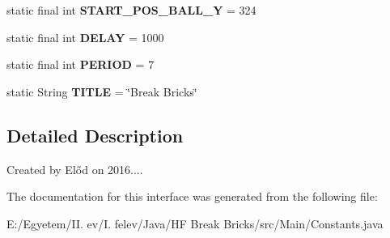 \begin{DoxyCompactItemize}
\item 
static final int {\bfseries S\+T\+A\+R\+T\+\_\+\+P\+O\+S\+\_\+\+B\+A\+L\+L\+\_\+Y} = 324\hypertarget{interface_main_1_1_constants_ad0e276f2bb956f718629e1f6fa1988e7}{}\label{interface_main_1_1_constants_ad0e276f2bb956f718629e1f6fa1988e7}

\item 
static final int {\bfseries D\+E\+L\+AY} = 1000\hypertarget{interface_main_1_1_constants_a01bea59ae678a38ee578ebc11212f236}{}\label{interface_main_1_1_constants_a01bea59ae678a38ee578ebc11212f236}

\item 
static final int {\bfseries P\+E\+R\+I\+OD} = 7\hypertarget{interface_main_1_1_constants_abb67371ab97c59dda27d443b0b00ba8f}{}\label{interface_main_1_1_constants_abb67371ab97c59dda27d443b0b00ba8f}

\item 
static String {\bfseries T\+I\+T\+LE} = \char`\"{}Break Bricks\char`\"{}\hypertarget{interface_main_1_1_constants_a91b7cff93f92379d2649db9297cf5503}{}\label{interface_main_1_1_constants_a91b7cff93f92379d2649db9297cf5503}

\end{DoxyCompactItemize}


\subsection{Detailed Description}
Created by Előd on 2016.... 

The documentation for this interface was generated from the following file\+:\begin{DoxyCompactItemize}
\item 
E\+:/\+Egyetem/\+I\+I. ev/\+I. felev/\+Java/\+H\+F Break Bricks/src/\+Main/Constants.\+java\end{DoxyCompactItemize}
